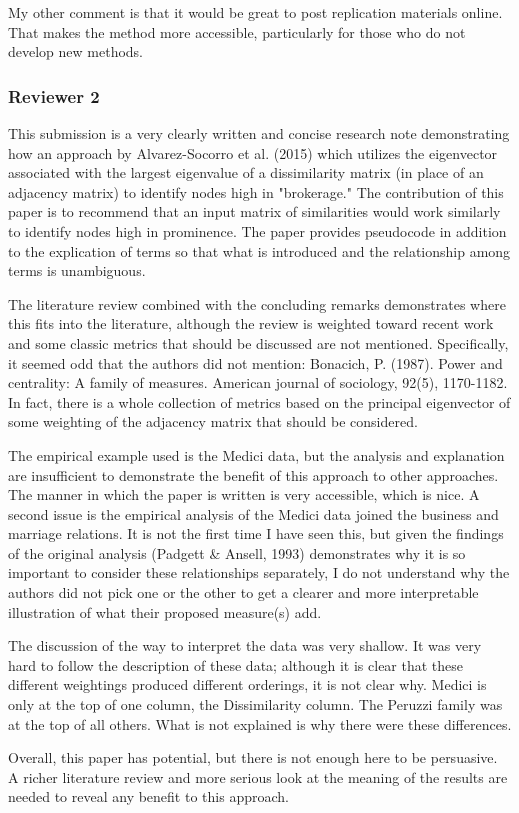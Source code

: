\documentclass[11pt]{article}
\begin{document}
My other comment is that it would be great to post replication materials online. That makes the method more accessible, particularly for those who do not develop new methods.

\subsubsection*{Reviewer 2}
This submission is a very clearly written and concise research note demonstrating how an approach by Alvarez-Socorro et al. (2015) which utilizes the eigenvector associated with the largest eigenvalue of a dissimilarity matrix (in place of an adjacency matrix) to identify nodes high in "brokerage." The contribution of this paper is to recommend that an input matrix of similarities would work similarly to identify nodes high in prominence. The paper provides pseudocode in addition to the explication of terms so that what is introduced and the relationship among terms is unambiguous.

The literature review combined with the concluding remarks demonstrates where this fits into the literature, although the review is weighted toward recent work and some classic metrics that should be discussed are not mentioned. Specifically, it seemed odd that the authors did not mention: Bonacich, P. (1987). Power and centrality: A family of measures. American journal of sociology, 92(5), 1170-1182. In fact, there is a whole collection of metrics based on the principal eigenvector of some weighting of the adjacency matrix that should be considered.

The empirical example used is the Medici data, but the analysis and explanation are insufficient to demonstrate the benefit of this approach to other approaches. The manner in which the paper is written is very accessible, which is nice. A second issue is the empirical analysis of the Medici data joined the business and marriage relations. It is not the first time I have seen this, but given the findings of the original analysis (Padgett \& Ansell, 1993) demonstrates why it is so important to consider these relationships separately, I do not understand why the authors did not pick one or the other to get a clearer and more interpretable illustration of what their proposed measure(s) add.

The discussion of the way to interpret the data was very shallow. It was very hard to follow the description of these data; although it is clear that these different weightings produced different orderings, it is not clear why. Medici is only at the top of one column, the Dissimilarity column. The Peruzzi family was at the top of all others. What is not explained is why there were these differences. 

Overall, this paper has potential, but there is not enough here to be persuasive. A richer literature review and more serious look at the meaning of the results are needed to reveal any benefit to this approach.
\end{document}
